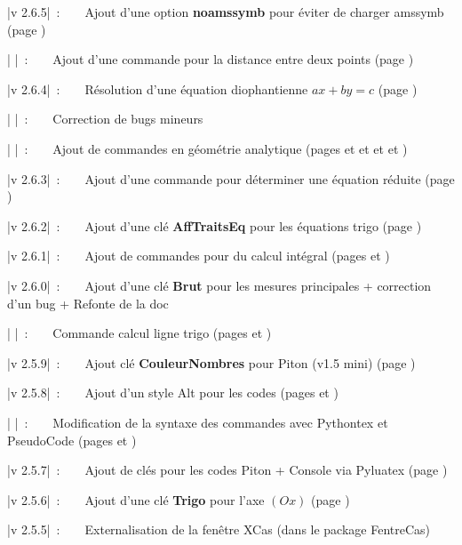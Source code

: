 \documentclass[a4paper,french,11pt]{article}
\newcommand\Cle[1]{{\bfseries\sffamily\textlangle #1\textrangle}}
\begin{document}
{\small \bverb|v 2.6.5|~:~~~~Ajout d'une option \Cle{noamssymb} pour éviter de charger \textsf{amssymb} (page \pageref{amssymb})

{\small \bverb|       |~:~~~~Ajout d'une commande pour la distance entre deux points (page \pageref{normevect})}

{\small \bverb|v 2.6.4|~:~~~~Résolution d'une équation diophantienne $ax+by=c$ (page \pageref{eqdioph})

{\small \bverb|       |~:~~~~Correction de bugs mineurs

{\small \bverb|       |~:~~~~Ajout de commandes en géométrie analytique (pages \pageref{affcoord} et \pageref{eqcartplan} et \pageref{eqparamdroite} et \pageref{eqcartdroite} et \pageref{distptplan})

{\small \bverb|v 2.6.3|~:~~~~Ajout d'une commande pour déterminer une équation réduite (page \pageref{eqreduite})

{\small \bverb|v 2.6.2|~:~~~~Ajout d'une clé \Cle{AffTraitsEq} pour les équations trigo (page \pageref{cercletrigo})

{\small \bverb|v 2.6.1|~:~~~~Ajout de commandes pour du calcul intégral (pages \pageref{calcintegr} et \pageref{integrtikz})

{\small \bverb|v 2.6.0|~:~~~~Ajout d'une clé \Cle{Brut} pour les mesures principales + correction d'un bug} + Refonte de la doc

{\small \bverb|       |~:~~~~Commande calcul ligne trigo (pages \pageref{mesureprincipale} et \pageref{lignestrigo})

{\small \bverb|v 2.5.9|~:~~~~Ajout clé \Cle{CouleurNombres} pour \textsf{Piton} (v1.5 mini) (page \pageref{pythonpiton})

{\small \bverb|v 2.5.8|~:~~~~Ajout d'un style \textsf{Alt} pour les codes (pages \pageref{pythonsimple} et \pageref{pytminted})

{\small \bverb|       |~:~~~~Modification de la syntaxe des commandes avec \textsf{Pythontex} et \textsf{PseudoCode} (pages \pageref{pythontex} et \pageref{pseudocode})

{\small \bverb|v 2.5.7|~:~~~~Ajout de clés pour les codes \textsf{Piton} + Console via \textsf{Pyluatex} (page \pageref{pythonpiton})

{\small \bverb|v 2.5.6|~:~~~~Ajout d'une clé \Cle{Trigo} pour l'axe $(Ox)$ (page \pageref{reperagetikz})

{\small \bverb|v 2.5.5|~:~~~~Externalisation de la fenêtre XCas (dans le package \textsf{FentreCas})

}}}}}}}}}}}}}}
\end{document}
